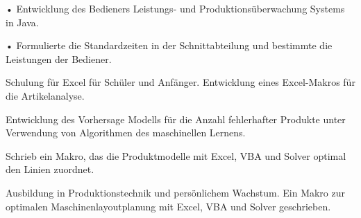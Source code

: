 \documentclass[11pt,a4paper,ragged2e,withhyper]{altacv}
\begin{document}
\begin{paracol}{2}



\large{}
\small{}
  
\par
  
• Entwicklung des Bedieners Leistungs- und Produktionsüberwachung Systems in Java.\par\smallskip
• Formulierte die Standardzeiten in der Schnittabteilung und bestimmte die Leistungen der Bediener.



\divider
Schulung für Excel für Schüler und Anfänger. Entwicklung eines Excel-Makros für die Artikelanalyse.
\par


Entwicklung des Vorhersage Modells für die Anzahl fehlerhafter Produkte unter Verwendung von Algorithmen des maschinellen Lernens.

\divider

Schrieb ein Makro, das die Produktmodelle mit Excel, VBA und Solver optimal den Linien zuordnet.

\divider

Ausbildung in Produktionstechnik und persönlichem Wachstum. Ein Makro zur optimalen Maschinenlayoutplanung mit Excel, VBA und Solver geschrieben.


\end{paracol}
\end{document}
